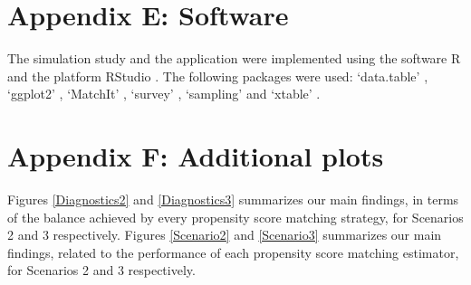 \documentclass[oupdraft]{bio}
\begin{document}
\section*{Appendix E: Software}
The simulation study and the application were implemented using the software R and the platform RStudio \citep{rstudio2015rstudio}. The following packages were used:  `data.table' \citep{dowle2015datatable}, `ggplot2' \citep{wickham2009ggplot2}, `MatchIt' \citep{ho2011matchit}, `survey' \citep{lumley2015survey}, `sampling' \citep{yves2015} and `xtable' \citep{dahl2016}. 

\section*{Appendix F: Additional plots}
Figures \ref{Diagnostics2} and \ref{Diagnostics3} summarizes our main findings, in terms of the balance achieved by every propensity score matching strategy, for Scenarios 2 and 3 respectively.
Figures \ref{Scenario2} and \ref{Scenario3} summarizes our main findings, related to the performance of each propensity score matching estimator, for Scenarios 2 and 3 respectively.
\end{document}
